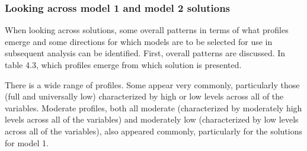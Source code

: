 \documentclass[]{msu-thesis}
\theoremstyle{definition}
\theoremstyle{definition}
\theoremstyle{definition}
\theoremstyle{remark}
\begin{document}
\subsubsection{Looking across model 1 and model 2
solutions}\label{looking-across-model-1-and-model-2-solutions}

When looking across solutions, some overall patterns in terms of what
profiles emerge and some directions for which models are to be selected
for use in subsequent analysis can be identified. First, overall
patterns are discussed. In table 4.3, which profiles emerge from which
solution is presented.

There is a wide range of profiles. Some appear very commonly,
particularly those (full and universally low) characterized by high or
low levels across all of the variables. Moderate profiles, both all
moderate (characterized by moderately high levels across all of the
variables) and moderately low (characterized by low levels across all of
the variables), also appeared commonly, particularly for the solutions
for model 1.
\end{document}

